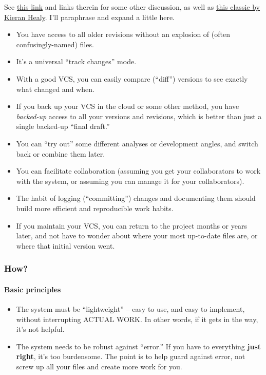 \documentclass[11pt]{article}
\begin{document}
See \href{http://jeromyanglim.blogspot.com/2010/11/getting-started-with-git-egit-eclipse.html}{this link} and links therein for some other discussion, as well as \href{http://www.kieranhealy.org/files/misc/workflow-apps.pdf}{this classic by Kieran Healy}. I'll paraphrase and expand a little here.
\begin{itemize}
\item You have access to all older revisions without an explosion of (often confusingly-named) files.
\item It's a universal ``track changes'' mode.
\item With a good VCS, you can easily compare (``diff'') versions to see exactly what changed and when.
\item If you back up your VCS in the cloud or some other method, you have \emph{backed-up} access to all your versions and revisions, which is better than just a single backed-up ``final draft.''
\item You can ``try out'' some different analyses or development angles, and switch back or combine them later.
\item You can facilitate collaboration (assuming you get your collaborators to work with the system, or assuming you can manage it for your collaborators).
\item The habit of logging (``committing'') changes and documenting them should build more efficient and reproducible work habits.
\item If you maintain your VCS, you can return to the project months or years later, and not have to wonder about where your most up-to-date files are, or where that initial version went.
\end{itemize}
\subsubsection{How?}
\label{sec-3-2-3}
\paragraph{Basic principles}
\label{sec-3-2-3-1}

\begin{itemize}
\item The system must be ``lightweight'' -- easy to use, and easy to implement, without interrupting ACTUAL WORK. In other words, if it gets in the way, it's not helpful.
\item The system needs to be robust against ``error.'' If you have to everything \textbf{just right}, it's too burdensome. The point is to help guard against error, not screw up all your files and create more work for you.
\end{itemize}
\end{document}
